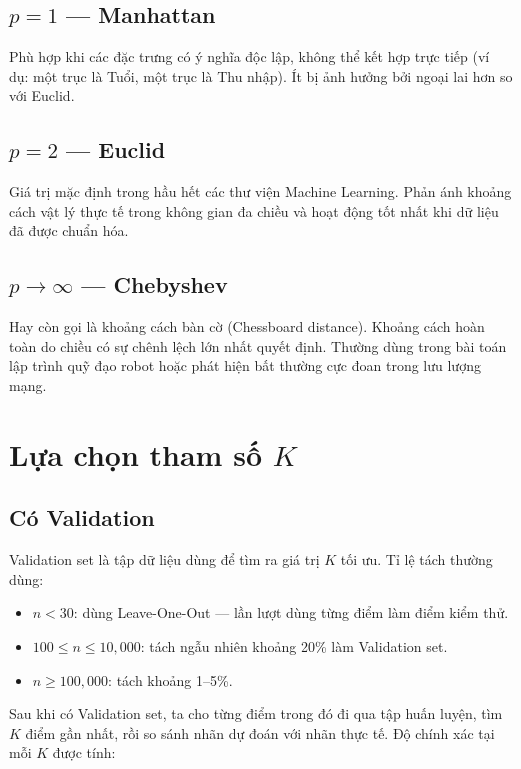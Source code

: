 \documentclass[12pt,a4paper]{article}
\begin{document}
\subsection{$p = 1$ — Manhattan}

Phù hợp khi các đặc trưng có ý nghĩa độc lập, không thể kết hợp trực tiếp (ví dụ: một trục là Tuổi, một trục là Thu nhập). Ít bị ảnh hưởng bởi ngoại lai hơn so với Euclid.

\subsection{$p = 2$ — Euclid}

Giá trị mặc định trong hầu hết các thư viện Machine Learning. Phản ánh khoảng cách vật lý thực tế trong không gian đa chiều và hoạt động tốt nhất khi dữ liệu đã được chuẩn hóa.

\subsection{$p \to \infty$ — Chebyshev}

Hay còn gọi là khoảng cách bàn cờ (Chessboard distance). Khoảng cách hoàn toàn do chiều có sự chênh lệch lớn nhất quyết định. Thường dùng trong bài toán lập trình quỹ đạo robot hoặc phát hiện bất thường cực đoan trong lưu lượng mạng.

\section{Lựa chọn tham số $K$}

\subsection{Có Validation}

Validation set là tập dữ liệu dùng để tìm ra giá trị $K$ tối ưu. Tỉ lệ tách thường dùng:
\begin{itemize}
    \item $n < 30$: dùng Leave-One-Out — lần lượt dùng từng điểm làm điểm kiểm thử.
    \item $100 \leq n \leq 10{,}000$: tách ngẫu nhiên khoảng 20\% làm Validation set.
    \item $n \geq 100{,}000$: tách khoảng 1--5\%.
\end{itemize}

Sau khi có Validation set, ta cho từng điểm trong đó đi qua tập huấn luyện, tìm $K$ điểm gần nhất, rồi so sánh nhãn dự đoán với nhãn thực tế. Độ chính xác tại mỗi $K$ được tính:
\end{document}
